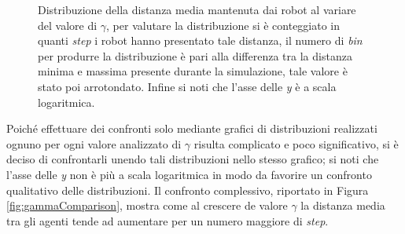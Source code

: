 \begin{figure}
	\hfill
	\caption{Distribuzione della distanza media mantenuta dai robot al variare del valore di $\gamma$, per valutare la distribuzione si è conteggiato in quanti \textit{step} i robot hanno presentato tale distanza, il numero di \textit{bin} per produrre la distribuzione è pari alla differenza tra la distanza minima e massima presente durante la simulazione, tale valore è stato poi arrotondato. Infine si noti che l'asse delle \textit{y} è a scala logaritmica.}
	\label{fig:gammaDistr}
\end{figure}
Poiché effettuare dei confronti solo mediante grafici di distribuzioni realizzati ognuno per ogni valore analizzato di $\gamma$ risulta complicato e poco significativo, si è deciso di confrontarli unendo tali distribuzioni nello stesso grafico; si noti che l'asse delle \textit{y} non è più a scala logaritmica in modo da favorire un confronto qualitativo delle distribuzioni.
Il confronto complessivo, riportato in Figura \ref{fig:gammaComparison}, mostra come al crescere de valore $\gamma$ la distanza media tra gli agenti tende ad aumentare per un numero maggiore di \textit{step}.
